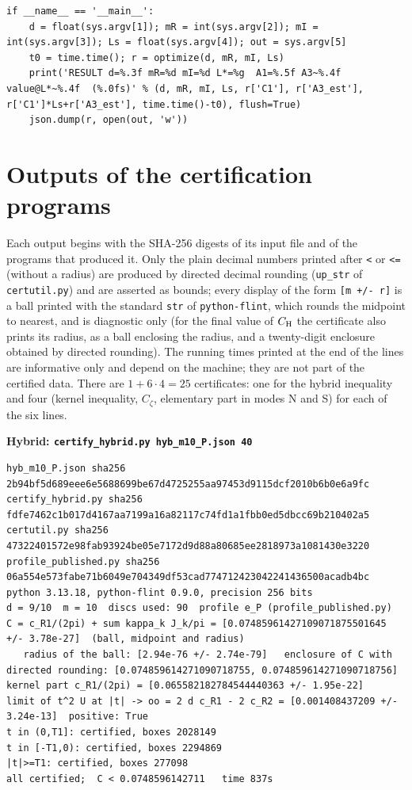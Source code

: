 \documentclass[11pt,reqno]{amsart}
\numberwithin{equation}{section}
\theoremstyle{definition}
\theoremstyle{remark}
\newcommand{\appsub}[1]{\par\medskip\noindent\textbf{#1}\par\nobreak\smallskip}
\begin{document}
\begin{lstlisting}
if __name__ == '__main__':
    d = float(sys.argv[1]); mR = int(sys.argv[2]); mI = int(sys.argv[3]); Ls = float(sys.argv[4]); out = sys.argv[5]
    t0 = time.time(); r = optimize(d, mR, mI, Ls)
    print('RESULT d=%.3f mR=%d mI=%d L*=%g  A1=%.5f A3~%.4f  value@L*~%.4f  (%.0fs)' % (d, mR, mI, Ls, r['C1'], r['A3_est'], r['C1']*Ls+r['A3_est'], time.time()-t0), flush=True)
    json.dump(r, open(out, 'w'))
\end{lstlisting}
\clearpage
\section{Outputs of the certification programs}\label{app:cert}
Each output begins with the SHA-256 digests of its input file and of the programs that produced it. Only the plain decimal numbers printed after \texttt{<} or \texttt{<=} (without a radius) are produced by directed decimal rounding (\texttt{up\_str} of \texttt{certutil.py}) and are asserted as bounds; every display of the form \texttt{[m +/- r]} is a ball printed with the standard \texttt{str} of \texttt{python-flint}, which rounds the midpoint to nearest, and is diagnostic only (for the final value of $C_{\rm H}$ the certificate also prints its radius, as a ball enclosing the radius, and a twenty-digit enclosure obtained by directed rounding). The running times printed at the end of the lines are informative only and depend on the machine; they are not part of the certified data. There are $1+6\cdot4=25$ certificates: one for the hybrid inequality and four (kernel inequality, $C_\zeta$, elementary part in modes N and S) for each of the six lines.
\appsub{Hybrid: \texttt{certify\_hybrid.py hyb\_m10\_P.json 40}}
\label{app:out_hybrid}
\begin{lstlisting}
hyb_m10_P.json sha256 2b94bf5d689eee6e5688699be67d4725255aa97453d9115dcf2010b6b0e6a9fc
certify_hybrid.py sha256 fdfe7462c1b017d4167aa7199a16a82117c74fd1a1fbb0ed5dbcc69b210402a5
certutil.py sha256 47322401572e98fab93924be05e7172d9d88a80685ee2818973a1081430e3220
profile_published.py sha256 06a554e573fabe71b6049e704349df53cad774712423042241436500acadb4bc
python 3.13.18, python-flint 0.9.0, precision 256 bits
d = 9/10  m = 10  discs used: 90  profile e_P (profile_published.py)
C = c_R1/(2pi) + sum kappa_k J_k/pi = [0.07485961427109071875501645 +/- 3.78e-27]  (ball, midpoint and radius)
   radius of the ball: [2.94e-76 +/- 2.74e-79]   enclosure of C with directed rounding: [0.074859614271090718755, 0.074859614271090718756]
kernel part c_R1/(2pi) = [0.065582182784544440363 +/- 1.95e-22]
limit of t^2 U at |t| -> oo = 2 d c_R1 - 2 c_R2 = [0.001408437209 +/- 3.24e-13]  positive: True
t in (0,T1]: certified, boxes 2028149
t in [-T1,0): certified, boxes 2294869
|t|>=T1: certified, boxes 277098
all certified;  C < 0.0748596142711   time 837s
\end{lstlisting}
\end{document}
